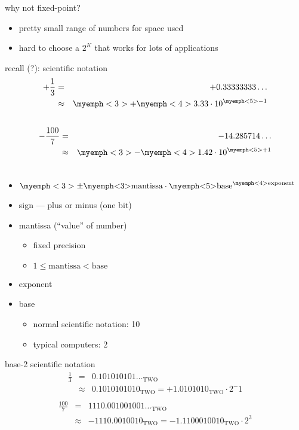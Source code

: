 \begin{frame}{why not fixed-point?}
\begin{itemize}
\item pretty small range of numbers for space used
\item hard to choose a $2^K$ that works for lots of applications
\end{itemize}
\end{frame}

\begin{frame}{recall (?): scientific notation}
\begin{eqnarray*}
+\frac{1}{3} &=& +0.33333333\ldots \\
            &\approx& \myemph<3>{+}\myemph<4>{3.33}\cdot 10^{\myemph<5>{-1}} \\\
\end{eqnarray*}
\begin{eqnarray*}
-\frac{100}{7} &=& -14.285714\ldots \\
            &\approx& \myemph<3>{-}\myemph<4>{1.42}\cdot 10^{\myemph<5>{+1}} \\\
\end{eqnarray*}
\begin{itemize}
\item<2-> $\myemph<3>{\pm}\text{\myemph<3>{mantissa}} \cdot \text{\myemph<5>{base}}^\text{\myemph<4>{exponent}}$
\item<3-> sign --- plus or minus (one bit)
\item<4-> mantissa (``value'' of number)
    \begin{itemize}
    \item fixed precision
    \item $1 \le \text{mantissa} < \text{base}$
    \end{itemize}
\item<5-> exponent
\item<6-> base
    \begin{itemize}
    \item normal scientific notation: 10
    \item typical computers: 2
    \end{itemize}
\end{itemize}
\end{frame}

\begin{frame}{base-2 scientific notation}
\begin{eqnarray*}
\frac{1}{3} &=& 0.101010101\ldots_\text{TWO}  \\\
            &\approx& 0.1010101010_\text{TWO} = +1.0101010_\text{TWO} \cdot 2^-1\\
\end{eqnarray*}
\begin{eqnarray*}
\frac{100}{7} &=& 1110.001001001\ldots_\text{TWO}  \\\
            &\approx& -1110.0010010_\text{TWO} = -1.1100010010_\text{TWO} \cdot 2^3\\
\end{eqnarray*}
\end{frame}

